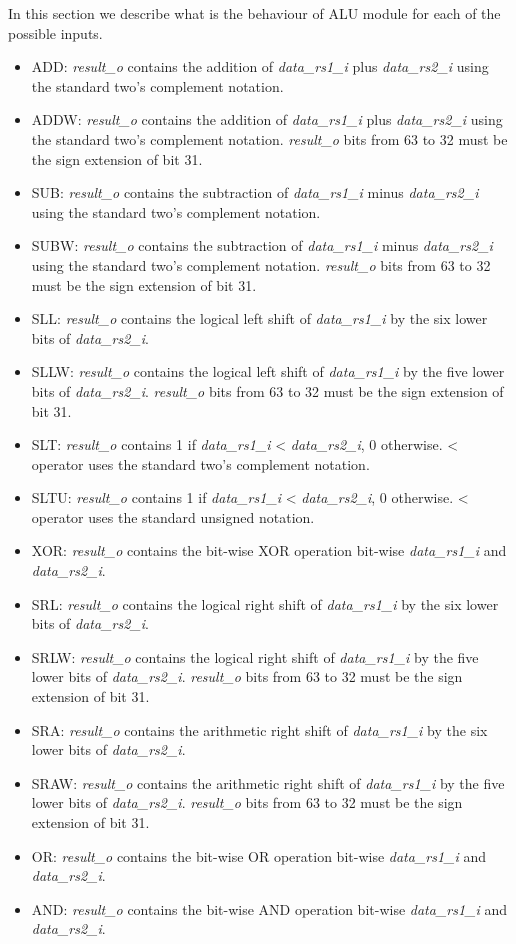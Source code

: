 In this section we describe what is the behaviour of ALU module for each of the possible inputs.

\begin{itemize}
  \item ADD: \emph{result\_o} contains the addition of \emph{data\_rs1\_i} plus \emph{data\_rs2\_i} using the standard two's complement notation.
  \item ADDW: \emph{result\_o} contains the addition of \emph{data\_rs1\_i} plus \emph{data\_rs2\_i} using the standard two's complement notation. \emph{result\_o} bits from 63 to 32 must be the sign extension of bit 31.
  \item SUB: \emph{result\_o} contains the subtraction of \emph{data\_rs1\_i} minus \emph{data\_rs2\_i} using the standard two's complement notation.
  \item SUBW: \emph{result\_o} contains the subtraction of \emph{data\_rs1\_i} minus \emph{data\_rs2\_i} using the standard two's complement notation.  \emph{result\_o} bits from 63 to 32 must be the sign extension of bit 31.
  \item SLL: \emph{result\_o} contains the logical left shift of \emph{data\_rs1\_i} by the six lower bits of \emph{data\_rs2\_i}.
  \item SLLW: \emph{result\_o} contains the logical left shift of \emph{data\_rs1\_i} by the five lower bits of \emph{data\_rs2\_i}. \emph{result\_o} bits from 63 to 32 must be the sign extension of bit 31.
  \item SLT: \emph{result\_o} contains 1 if \emph{data\_rs1\_i} < \emph{data\_rs2\_i}, 0  otherwise. < operator uses the standard two's complement notation. 
  \item SLTU: \emph{result\_o} contains 1 if \emph{data\_rs1\_i} < \emph{data\_rs2\_i}, 0  otherwise. < operator uses the standard unsigned notation. 
  \item XOR: \emph{result\_o} contains the bit-wise XOR operation bit-wise \emph{data\_rs1\_i} and \emph{data\_rs2\_i}.
  \item SRL: \emph{result\_o} contains the logical right shift of \emph{data\_rs1\_i} by the six lower bits of \emph{data\_rs2\_i}.
  \item SRLW: \emph{result\_o} contains the logical right shift of \emph{data\_rs1\_i} by the five lower bits of \emph{data\_rs2\_i}. \emph{result\_o} bits from 63 to 32 must be the sign extension of bit 31.
  \item SRA: \emph{result\_o} contains the arithmetic right shift of \emph{data\_rs1\_i} by the six lower bits of \emph{data\_rs2\_i}.
  \item SRAW: \emph{result\_o} contains the arithmetic right shift of \emph{data\_rs1\_i} by the five lower bits of \emph{data\_rs2\_i}. \emph{result\_o} bits from 63 to 32 must be the sign extension of bit 31.
  \item OR:  \emph{result\_o} contains the bit-wise OR operation bit-wise \emph{data\_rs1\_i} and \emph{data\_rs2\_i}.
  \item AND: \emph{result\_o} contains the bit-wise AND operation bit-wise \emph{data\_rs1\_i} and \emph{data\_rs2\_i}.
\end{itemize}

